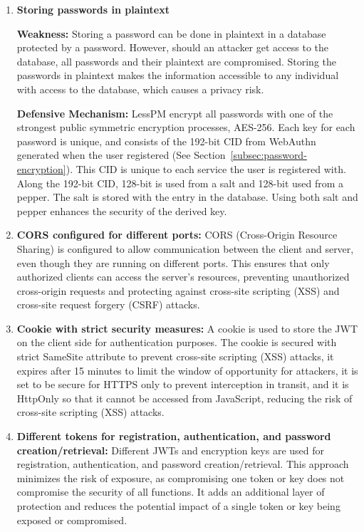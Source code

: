 \begin{enumerate}[label=$\blacktriangleright$]
  \item \textbf{Storing passwords in plaintext}

  \textbf{Weakness:}
  Storing a password can be done in plaintext in a database protected by a
  password.
  However, should an attacker get access to the database, all passwords and
  their plaintext are compromised.
  Storing the passwords in plaintext makes the information accessible to any
  individual with access to the database, which causes a privacy risk.

  \textbf{Defensive Mechanism:}
  LessPM encrypt all passwords with one of the strongest public symmetric
  encryption processes, AES-256.
  Each key for each password is unique, and consists of the 192-bit CID from
  WebAuthn generated when the user registered (See
  Section~\ref{subsec:password-encryption}).
  This CID is unique to each service the user is registered with.
  Along the 192-bit CID, 128-bit is used from a salt and 128-bit used from a
  pepper.
  The salt is stored with the entry in the database.
  Using both salt and pepper enhances the security of the derived key.

  \item \textbf{CORS configured for different ports:} CORS (Cross-Origin Resource Sharing) is configured to allow communication between the client and server, even though they are running on different ports. This ensures that only authorized clients can access the server's resources, preventing unauthorized cross-origin requests and protecting against cross-site scripting (XSS) and cross-site request forgery (CSRF) attacks.

  \item \textbf{Cookie with strict security measures:} A cookie is used to store the JWT on the client side for authentication purposes. The cookie is secured with strict SameSite attribute to prevent cross-site scripting (XSS) attacks, it expires after 15 minutes to limit the window of opportunity for attackers, it is set to be secure for HTTPS only to prevent interception in transit, and it is HttpOnly so that it cannot be accessed from JavaScript, reducing the risk of cross-site scripting (XSS) attacks.

  \item \textbf{Different tokens for registration, authentication, and password creation/retrieval:} Different JWTs and encryption keys are used for registration, authentication, and password creation/retrieval. This approach minimizes the risk of exposure, as compromising one token or key does not compromise the security of all functions. It adds an additional layer of protection and reduces the potential impact of a single token or key being exposed or compromised.
\end{enumerate}

